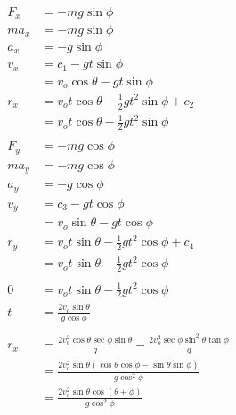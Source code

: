 \documentclass{article}
\begin{document}
\begin{align*}
  F_x   & = -m g \sin \phi                                                                                            \\
  m a_x & = -m g \sin \phi                                                                                            \\
  a_x   & = -g \sin \phi                                                                                              \\
  v_x   & = c_1 - g t \sin \phi                                                                                       \\
        & = v_o \cos \theta - g t \sin \phi                                                                           \\
  r_x   & = v_o t \cos \theta - \frac{1}{2} g t^2 \sin \phi + c_2                                                     \\
        & = v_o t \cos \theta - \frac{1}{2} g t^2 \sin \phi                                                           \\ \\
  F_y   & = -m g \cos \phi                                                                                            \\
  m a_y & = -m g \cos \phi                                                                                            \\
  a_y   & = -g \cos \phi                                                                                              \\
  v_y   & = c_3 - g t \cos \phi                                                                                       \\
        & = v_o \sin \theta - g t \cos \phi                                                                           \\
  r_y   & = v_o t \sin \theta - \frac{1}{2} g t^2 \cos \phi + c_4                                                     \\
        & = v_o t \sin \theta - \frac{1}{2} g t^2 \cos \phi                                                           \\ \\
  0     & = v_o t \sin \theta - \frac{1}{2} g t^2 \cos \phi                                                           \\
  t     & = \frac{2 v_o \sin \theta}{g \cos \phi}                                                                     \\ \\
  r_x   & = \frac{2 v_o^2 \cos \theta \sec \phi \sin \theta}{g} - \frac{2 v_o^2 \sec \phi \sin^2 \theta \tan \phi}{g} \\
        & = \frac{2 v_o^2 \sin \theta (\cos \theta \cos \phi - \sin \theta \sin \phi)}{g \cos^2 \phi}                 \\
        & = \frac{2 v_o^2 \sin \theta \cos (\theta + \phi)}{g \cos^2 \phi}
\end{align*}
\end{document}
